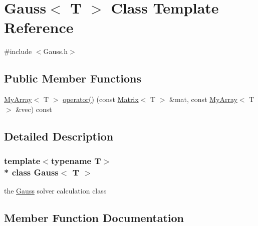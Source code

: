 \hypertarget{classGauss}{}\section{Gauss$<$ T $>$ Class Template Reference}
\label{classGauss}


{\ttfamily \#include $<$Gauss.\+h$>$}

\subsection*{Public Member Functions}
\begin{DoxyCompactItemize}
\item 
\hyperlink{classMyArray}{My\+Array}$<$ T $>$ \hyperlink{classGauss_a26c6cb82642023d213f05723f23af627}{operator()} (const \hyperlink{classMatrix}{Matrix}$<$ T $>$ \&mat, const \hyperlink{classMyArray}{My\+Array}$<$ T $>$ \&vec) const 
\end{DoxyCompactItemize}


\subsection{Detailed Description}
\subsubsection*{template$<$typename T$>$\\*
class Gauss$<$ T $>$}

the \hyperlink{classGauss}{Gauss} solver calculation class 

\subsection{Member Function Documentation}
